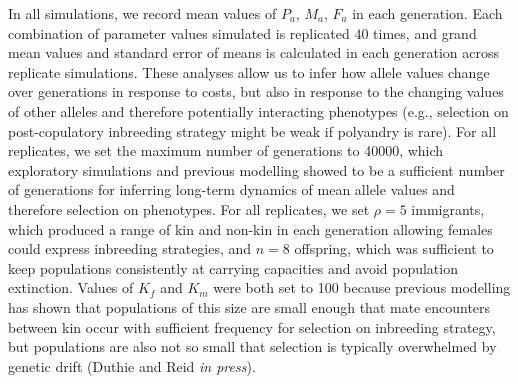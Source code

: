 \documentclass[10pt,letterpaper]{article}
\begin{document}


In all simulations, we record mean values of $P_{a}$, $M_{a}$, $F_{a}$ in each generation. Each combination of parameter values simulated is replicated $40$ times, and grand mean values and standard error of means is calculated in each generation across replicate simulations. These analyses allow us to infer how allele values change over generations in response to costs, but also in response to the changing values of other alleles and therefore potentially interacting phenotypes (e.g., selection on post-copulatory inbreeding strategy might be weak if polyandry is rare). For all replicates, we set the maximum number of generations to 40000, which exploratory simulations and previous modelling \cite[][]{Duthie} showed to be a sufficient number of generations for inferring long-term dynamics of mean allele values and therefore selection on phenotypes.  For all replicates, we set $\rho=5$ immigrants, which produced a range of kin and non-kin in each generation allowing females could express inbreeding strategies, and $n=8$ offspring, which was sufficient to keep populations consistently at carrying capacities and avoid population extinction. Values of $K_{f}$ and $K_{m}$ were both set to 100 because previous modelling has shown that populations of this size are small enough that mate encounters between kin occur with sufficient frequency for selection on inbreeding strategy, but populations are also not so small that selection is typically overwhelmed by genetic drift (Duthie and Reid \textit{in press}).
\end{document}
